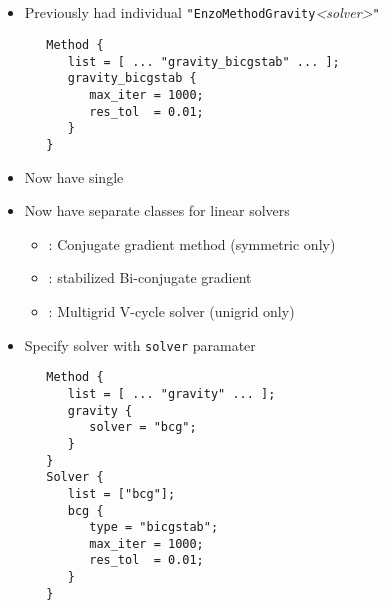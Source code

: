 \NEWSEC


\subsection{\ssRecentGravity}



%  
%
\begin{frame}[fragile,label=ss-recent-solvers] 
  \secframetitle{\ssRecentSolvers}
  \begin{itemize}
  \item Previously had individual \verb+"EnzoMethodGravity+\textit{<solver>}\verb+"+ 
\begin{verbatim}
   Method {
      list = [ ... "gravity_bicgstab" ... ];
      gravity_bicgstab {
         max_iter = 1000;
         res_tol  = 0.01;
      }
   }
\end{verbatim}
    \vspace{-0.1in}
  \item Now have single  
  \item Now have separate  classes for linear solvers
  \begin{itemize}
    \item {}: Conjugate gradient method (symmetric only)
    \item {}: stabilized Bi-conjugate gradient
    \item {}: Multigrid V-cycle solver (unigrid only)
  \end{itemize}
    \end{itemize}
\end{frame}


\begin{frame}[fragile,label=ss-recent-solvers] 
  \secframetitle{\ssRecentSolvers}
  \begin{itemize}
  \item Specify solver with \verb+solver+ paramater
    \small
\begin{verbatim}
   Method {
      list = [ ... "gravity" ... ];
      gravity {
         solver = "bcg";
      }
   }
   Solver {
      list = ["bcg"];
      bcg {
         type = "bicgstab";
         max_iter = 1000;
         res_tol  = 0.01;
      }
   }
\end{verbatim}
%  
%
    \end{itemize}
\end{frame}
%
